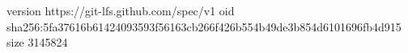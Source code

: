 version https://git-lfs.github.com/spec/v1
oid sha256:5fa37616b61424093593f56163cb266f426b554b49de3b854d6101696fb4d915
size 3145824
